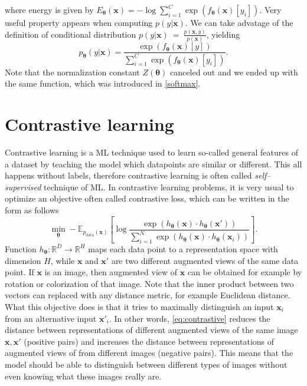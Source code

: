 where energy is given by $E_{\boldsymbol{\theta}}(\boldsymbol{x}) = -\log\sum_{i=1}^C\exp\left({f_{\boldsymbol{\theta}}\left(\boldsymbol{x}\right)[y_i]}\right)$. Very useful property appears when computing $p(y|\boldsymbol{x})$. We can take advatage of the definition of conditional distribution $p(y|\boldsymbol{x})~=~\frac{p\left(\boldsymbol{x},y\right)}{p\left(\boldsymbol{x}\right)}$, yielding  
\begin{equation}\label{softmaxdef}
	p_{\boldsymbol{\theta}}\left(y|\boldsymbol{x}\right) = \frac{\exp\left({f_{\boldsymbol{\theta}}\left(\boldsymbol{x}\right)[y]}\right)}{\sum_{i=1}^C\exp\left({f_{\boldsymbol{\theta}}\left(\boldsymbol{x}\right)[y_i]}\right)}.
\end{equation}
Note that the normalization constant $Z(\boldsymbol{\theta})$ canceled out and we ended up with the same function, which was introduced in \eqref{softmax}. 
\section{Contrastive learning}
 Contrastive learning \cite{contrastive1, contrastive2} is a ML technique used to learn so-called general features of a dataset by teaching the model which datapoints are similar or different. This all happens without labels, therefore contrastive learning is often called \emph{self--supervised} technique of ML.  In contrastive learning problems, it is very usual to optimize an objective often called contrastive loss, which can be written in the form as follows
\begin{equation}\label{eq:contrastive}
	\min_{\boldsymbol{\theta}}- \mathbb{E}_{p_{\mathrm{data}}(\boldsymbol{x})}\left[\log \frac{\exp\left({h_{\boldsymbol{\theta}}\left(\boldsymbol{x}\right)\cdot h_{\boldsymbol{\theta}}\left(\boldsymbol{x}'\right)}\right)}{\sum_{i=1}^N\exp\left({h_{\boldsymbol{\theta}}\left(\boldsymbol{x}\right)\cdot h_{\boldsymbol{\theta}}(\boldsymbol{x}_i) }\right)} \right].
\end{equation}
Function $h_{\boldsymbol{\theta}}: \mathbb{R}^D \to \mathbb{R}^H$ maps each data point to a representation space with dimension $H$, while $\boldsymbol{x}$ and $\boldsymbol{x}'$ are two different augmented views of the same data point. If $\boldsymbol{x}$ is an image, then augmented view of $\boldsymbol{x}$ can be obtained for example by rotation or colorization of that image. Note that the inner product between two vectors can replaced with any distance metric, for example Euclidean distance. \\
What this objective does is that it tries to maximally distinguish an input $\boldsymbol{x}_i$ from an alternative input $\boldsymbol{x}'_i$. In other words, \eqref{eq:contrastive} reduces the distance between representations of different augmented views of the same image $\boldsymbol{x}, \boldsymbol{x}'$ (positive pairs) and increases the distance between representations of augmented views of from different images (negative pairs). This means that the model should be able to distinguish between different types of images without even knowing what these images really are. 

